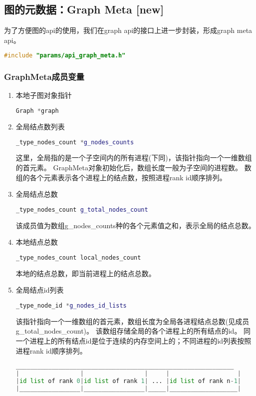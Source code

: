 \subsection{图的元数据：Graph Meta  {\color{cyan} [\textbf{new}] } }
为了方便图的api的使用，我们在graph api的接口上进一步封装，形成graph meta api。

\begin{lstlisting}[language=c]
#include "params/api_graph_meta.h"
\end{lstlisting}

\subsubsection*{GraphMeta成员变量}

\begin{enumerate}
  \item 本地子图对象指针
\begin{lstlisting}[language=c++]
    Graph *graph
\end{lstlisting}

  \item 全局结点数列表
\begin{lstlisting}[language=c++]
    _type_nodes_count *g_nodes_counts
\end{lstlisting}
这里，全局指的是一个子空间内的所有进程(下同)，该指针指向一个一维数组的首元素。
GraphMeta对象初始化后，数组长度一般为子空间的进程数。
数组的各个元素表示各个进程上的结点数，按照进程rank id顺序排列。

  \item 全局结点总数
\begin{lstlisting}[language=c++]
    _type_nodes_count g_total_nodes_count
\end{lstlisting}
该成员值为数组g\_nodes\_counts种的各个元素值之和，表示全局的结点总数。

  \item 本地结点总数
\begin{lstlisting}[language=c++]
    _type_nodes_count local_nodes_count
\end{lstlisting}
本地的结点总数，即当前进程上的结点总数。

  \item 全局结点id列表
\begin{lstlisting}[language=c++]
    _type_node_id *g_nodes_id_lists
\end{lstlisting}
该指针指向一个一维数组的首元素，数组长度为全局各进程结点总数(见成员g\_total\_nodes\_count)。
该数组存储全局的各个进程上的所有结点的id。
同一个进程上的所有结点id是位于连续的内存空间上的；不同进程的id列表按照进程rank id顺序排列。
\begin{lstlisting}[language=python]
 _____________________________________________________________
|                 |                 |     |                   |
|id list of rank 0|id list of rank 1| ... |id list of rank n-1|
|_________________|_________________|_____|___________________|
\end{lstlisting}


\end{enumerate}
